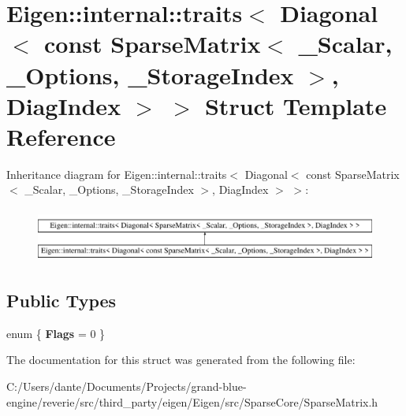 \hypertarget{struct_eigen_1_1internal_1_1traits_3_01_diagonal_3_01const_01_sparse_matrix_3_01___scalar_00_01_60e2cc1eeaa955bbaca3dbe42dd8c748}{}\section{Eigen\+::internal\+::traits$<$ Diagonal$<$ const Sparse\+Matrix$<$ \+\_\+\+Scalar, \+\_\+\+Options, \+\_\+\+Storage\+Index $>$, Diag\+Index $>$ $>$ Struct Template Reference}
\label{struct_eigen_1_1internal_1_1traits_3_01_diagonal_3_01const_01_sparse_matrix_3_01___scalar_00_01_60e2cc1eeaa955bbaca3dbe42dd8c748}
Inheritance diagram for Eigen\+::internal\+::traits$<$ Diagonal$<$ const Sparse\+Matrix$<$ \+\_\+\+Scalar, \+\_\+\+Options, \+\_\+\+Storage\+Index $>$, Diag\+Index $>$ $>$\+:\begin{figure}[H]
\begin{center}
\leavevmode
\includegraphics[height=1.797753cm]{struct_eigen_1_1internal_1_1traits_3_01_diagonal_3_01const_01_sparse_matrix_3_01___scalar_00_01_60e2cc1eeaa955bbaca3dbe42dd8c748}
\end{center}
\end{figure}
\subsection*{Public Types}
\begin{DoxyCompactItemize}
\item 
\mbox{\label{struct_eigen_1_1internal_1_1traits_3_01_diagonal_3_01const_01_sparse_matrix_3_01___scalar_00_01_60e2cc1eeaa955bbaca3dbe42dd8c748_a1c6f698f1f21fc9b86331dd9ba40ff5c}} 
enum \{ {\bfseries Flags} = 0
 \}
\end{DoxyCompactItemize}


The documentation for this struct was generated from the following file\+:\begin{DoxyCompactItemize}
\item 
C\+:/\+Users/dante/\+Documents/\+Projects/grand-\/blue-\/engine/reverie/src/third\+\_\+party/eigen/\+Eigen/src/\+Sparse\+Core/Sparse\+Matrix.\+h\end{DoxyCompactItemize}
